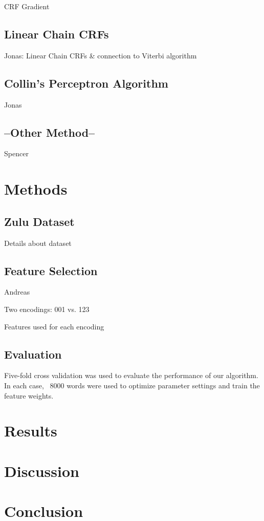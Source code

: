 \documentclass[10pt,twocolumn,letterpaper]{article}
\begin{document}
CRF Gradient

\subsection{Linear Chain CRFs}
Jonas: Linear Chain CRFs \& connection to Viterbi algorithm
\subsection{Collin's Perceptron Algorithm}
Jonas
\subsection{--Other Method--}
Spencer

\section{Methods}
\subsection{Zulu Dataset}
Details about dataset

\subsection{Feature Selection}
Andreas


Two encodings: 001 vs. 123

Features used for each encoding

\subsection{Evaluation}
Five-fold cross validation was used to evaluate the performance of our algorithm.  In each case, ~8000 words were used to optimize parameter settings and train the feature weights. 



\section{Results}
\section{Discussion}
\section{Conclusion}



{\small


}
\end{document}
